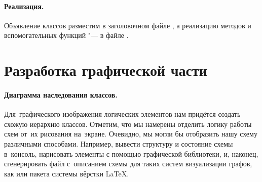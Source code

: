 \begin{center}\end{center}


\paragraph{Реализация.}
Объявление классов разместим в заголовочном файле , а реализацию методов и вспомогательных функций "--- в файле .

\bigskip
{}


\clearpage
\section{Разработка графической части}
\paragraph{Диаграмма наследования классов.}
Для~графического изображения логических элементов нам придётся создать схожую иерархию классов. Отметим, что мы намерены отделить логику работы схем от~их рисования на~экране. Очевидно, мы могли бы отобразить нашу схему различными способами. Например, вывести структуру и состояние схемы в~консоль, нарисовать элементы с помощью графической библиотеки, и, наконец, сгенерировать файл с~описанием схемы для таких систем визуализации графов, как  или пакета  системы вёрстки \LaTeX.

